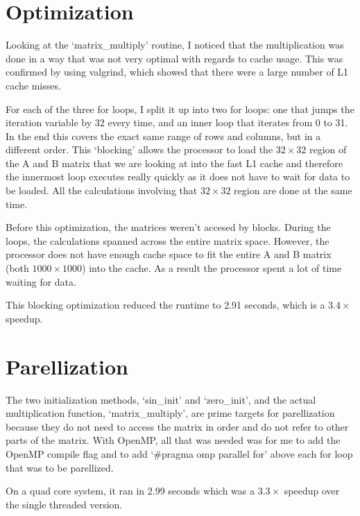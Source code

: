 \documentclass[12pt]{article}
\begin{document}
\section{Optimization}
Looking at the `matrix\_multiply' routine, I noticed that the multiplication was done in a way that was not very optimal with regards to cache usage. This was confirmed by using valgrind, which showed that there were a large number of L1 cache misses.

For each of the three for loops, I split it up into two for loops: one that jumps the iteration variable by 32 every time, and an inner loop that iterates from 0 to 31. In the end this covers the exact same range of rows and columns, but in a different order. This `blocking' allows the processor to load the $32\times 32$ region of the A and B matrix that we are looking at into the fast L1 cache and therefore the innermost loop executes really quickly as it does not have to wait for data to be loaded. All the calculations involving that $32\times 32$ region are done at the same time.

Before this optimization, the matrices weren't accesed by blocks. During the loops, the calculations spanned across the entire matrix space. However, the processor does not have enough cache space to fit the entire A and B matrix (both $1000 \times 1000$) into the cache. As a result the processor spent a lot of time waiting for data.

This blocking optimization reduced the runtime to 2.91 seconds, which is a $3.4 \times$ speedup.

\section{Parellization}
The two initialization methods, `sin\_init' and `zero\_init', and the actual multiplication function, `matrix\_multiply', are prime targets for parellization because they do not need to access the matrix in order and do not refer to other parts of the matrix. With OpenMP, all that was needed was for me to add the OpenMP compile flag and to add `\#pragma omp parallel for' above each for loop that was to be parellized. 

On a quad core system, it ran in 2.99 seconds which was a $3.3\times$ speedup over the single threaded version.
\end{document}
